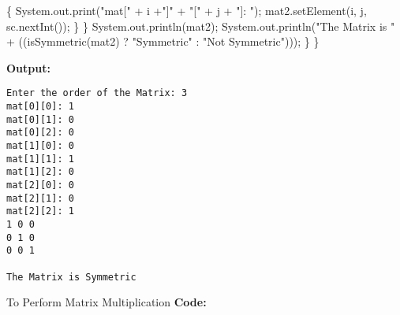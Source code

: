 \documentclass[
  12pt,
]{article}
\newenvironment{Shaded}{}{}
\newcommand{\BuiltInTok}[1]{\textcolor[rgb]{0.00,0.50,0.00}{#1}}
\newcommand{\FunctionTok}[1]{\textcolor[rgb]{0.02,0.16,0.49}{#1}}
\newcommand{\NormalTok}[1]{#1}
\newcommand{\OperatorTok}[1]{\textcolor[rgb]{0.40,0.40,0.40}{#1}}
\newcommand{\StringTok}[1]{\textcolor[rgb]{0.25,0.44,0.63}{#1}}
\begin{document}
\begin{Shaded}
\begin{Highlighting}[numbers=left,,]
            \OperatorTok{\{}
                \BuiltInTok{System}\OperatorTok{.}\FunctionTok{out}\OperatorTok{.}\FunctionTok{print}\OperatorTok{(}\StringTok{"mat["} \OperatorTok{+}\NormalTok{ i }\OperatorTok{+}\StringTok{"]"} \OperatorTok{+} \StringTok{"["} \OperatorTok{+}\NormalTok{ j }\OperatorTok{+} \StringTok{"]: "}\OperatorTok{);}
\NormalTok{                mat2}\OperatorTok{.}\FunctionTok{setElement}\OperatorTok{(}\NormalTok{i}\OperatorTok{,}\NormalTok{ j}\OperatorTok{,}\NormalTok{ sc}\OperatorTok{.}\FunctionTok{nextInt}\OperatorTok{());}
            \OperatorTok{\}}
        \OperatorTok{\}}
        \BuiltInTok{System}\OperatorTok{.}\FunctionTok{out}\OperatorTok{.}\FunctionTok{println}\OperatorTok{(}\NormalTok{mat2}\OperatorTok{);}
        \BuiltInTok{System}\OperatorTok{.}\FunctionTok{out}\OperatorTok{.}\FunctionTok{println}\OperatorTok{(}\StringTok{"The Matrix is "} \OperatorTok{+} \OperatorTok{((}\FunctionTok{isSymmetric}\OperatorTok{(}\NormalTok{mat2}\OperatorTok{)} \OperatorTok{?} \StringTok{"Symmetric"} \OperatorTok{:} \StringTok{"Not Symmetric"}\OperatorTok{)));}
    \OperatorTok{\}}
\OperatorTok{\}}
\end{Highlighting}
\end{Shaded}

\textbf{Output:}

\begin{verbatim}
Enter the order of the Matrix: 3
mat[0][0]: 1
mat[0][1]: 0
mat[0][2]: 0
mat[1][0]: 0
mat[1][1]: 1
mat[1][2]: 0
mat[2][0]: 0
mat[2][1]: 0
mat[2][2]: 1
1 0 0 
0 1 0
0 0 1

The Matrix is Symmetric
\end{verbatim}

To Perform Matrix Multiplication \textbf{Code:}
\end{document}
